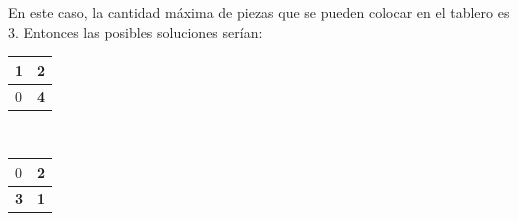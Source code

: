 \documentclass[11pt, a4paper, twoside]{article}
\begin{document}
\begin{ejemplo}
  En este caso, la cantidad máxima de piezas que se pueden colocar en el tablero es $3$. Entonces las posibles soluciones serían:

  \begin{center}
    \begin{minipage}{0.45\textwidth}
        \centering
        \begin{tabular}{ | l | l |}
            \hline
            \textbf{1}  & \textbf{2} \\
            \hline
            $0$  & \textbf{4} \\
            \hline
        \end{tabular}  \\
    \end{minipage}
    \begin{minipage}{0.45\textwidth}
        \begin{tabular}{ | l | l |}
            \hline
            $0$     & \textbf{2} \\
            \hline
            \textbf{3}  & \textbf{1} \\
            \hline
        \end{tabular} \\
    \end{minipage}
  \end{center}
\end{ejemplo}
\end{document}

